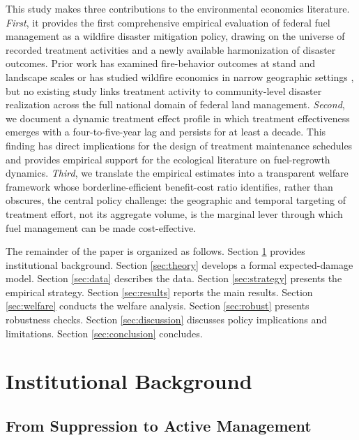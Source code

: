 \documentclass[12pt, letterpaper]{article}
\begin{document}
This study makes three contributions to the environmental economics literature. \textit{First}, it provides the first comprehensive empirical evaluation of federal fuel management as a wildfire disaster mitigation policy, drawing on the universe of recorded treatment activities and a newly available harmonization of disaster outcomes. Prior work has examined fire-behavior outcomes at stand and landscape scales \citep{agee2005, finney2001, stephens2012} or has studied wildfire economics in narrow geographic settings \citep{baylis2023, plantinga2022}, but no existing study links treatment activity to community-level disaster realization across the full national domain of federal land management. \textit{Second}, we document a dynamic treatment effect profile in which treatment effectiveness emerges with a four-to-five-year lag and persists for at least a decade. This finding has direct implications for the design of treatment maintenance schedules and provides empirical support for the ecological literature on fuel-regrowth dynamics. \textit{Third}, we translate the empirical estimates into a transparent welfare framework whose borderline-efficient benefit-cost ratio identifies, rather than obscures, the central policy challenge: the geographic and temporal targeting of treatment effort, not its aggregate volume, is the marginal lever through which fuel management can be made cost-effective.

The remainder of the paper is organized as follows. Section \ref{sec:background} provides institutional background. Section \ref{sec:theory} develops a formal expected-damage model. Section \ref{sec:data} describes the data. Section \ref{sec:strategy} presents the empirical strategy. Section \ref{sec:results} reports the main results. Section \ref{sec:welfare} conducts the welfare analysis. Section \ref{sec:robust} presents robustness checks. Section \ref{sec:discussion} discusses policy implications and limitations. Section \ref{sec:conclusion} concludes.


\section{Institutional Background}\label{sec:background}

\subsection{From Suppression to Active Management}
\end{document}
